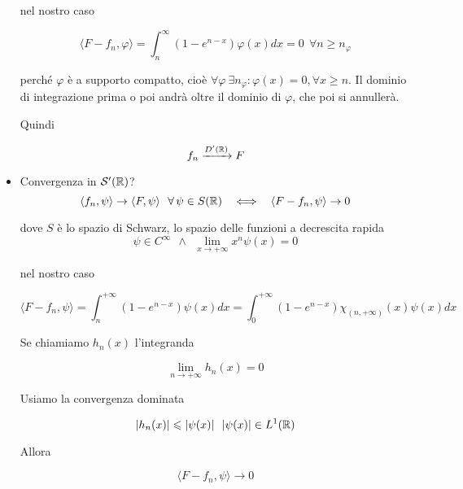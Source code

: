 \begin{itemize}
nel nostro caso

\begin{equation*}
\langle F-f_{n} ,\varphi \rangle =\int ^{\infty }_{n}\left( 1-e^{n-x}\right) \varphi (x)dx=0\ \ \forall n\geqslant n_{\varphi }
\end{equation*}

perché $\varphi $ è a supporto compatto, cioè $\forall \varphi \ \exists n_{\varphi } :\varphi ( x) =0,\forall x\geqslant n$. Il dominio di integrazione prima o poi andrà oltre il dominio di $\varphi $, che poi si annullerà.

Quindi

\begin{equation*}
f_{n}\xrightarrow{D'(\mathbb{R}  )} F
\end{equation*}
\item Convergenza in $\mathcal{S}  '(\mathbb{R}  )$?\begin{equation*}
\langle f_{n} ,\psi \rangle \rightarrow \langle F,\psi \rangle \ \ \forall \psi \in S(\RR ) \ \ \iff \ \ \langle F-f_{n} ,\psi \rangle \rightarrow 0
\end{equation*}

dove $S$ è lo spazio di Schwarz, lo spazio delle funzioni a decrescita rapida\begin{equation*}
\psi \in C^{\infty } \ \ \land \ \ \lim\limits _{x\rightarrow +\infty } x^{n} \psi ( x) =0
\end{equation*}

nel nostro caso

\begin{equation*}
\langle F-f_{n} ,\psi \rangle =\int ^{+\infty }_{n}\left( 1-e^{n-x}\right) \psi ( x) dx=\int ^{+\infty }_{0}\left( 1-e^{n-x}\right) \chi _{( n,+\infty )}( x) \psi ( x) dx
\end{equation*}

Se chiamiamo $h_{n}( x)$ l'integranda

\begin{equation*}
\lim\limits _{n\rightarrow +\infty } h_{n}( x) =0
\end{equation*}

Usiamo la convergenza dominata

\begin{equation*}
| h_{n}( x)| \leqslant | \psi ( x)| \ \ | \psi ( x)| \in L^{1}(\RR )
\end{equation*}

Allora

\begin{equation*}
\langle F-f_{n} ,\psi \rangle \rightarrow 0
\end{equation*}
\end{itemize}
